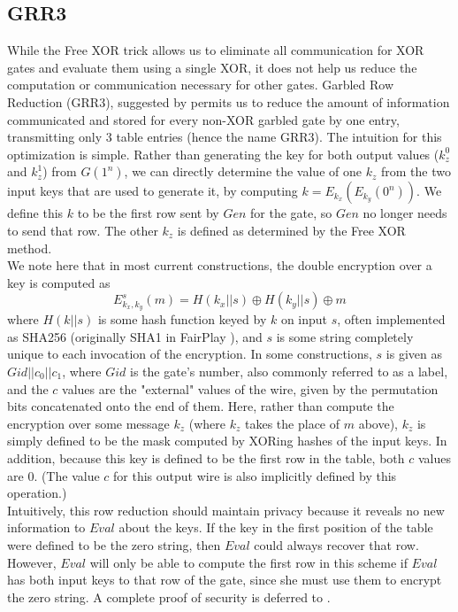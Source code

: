 \documentclass{article}
\begin{document}
\subsection{GRR3}
While the Free XOR trick allows us to eliminate all communication for XOR gates and evaluate them using a single XOR, it does not help us reduce the computation or communication necessary for other gates. Garbled Row Reduction (GRR3), suggested by \cite{GRR} permits us to reduce the amount of information communicated and stored for every non-XOR garbled gate by one entry, transmitting only 3 table entries (hence the name GRR3). The intuition for this optimization is simple. Rather than generating the key for both output values ($k_z^0$ and $k_z^1$) from $G(1^n)$, we can directly determine the value of one $k_z$ from the two input keys that are used to generate it, by computing $k = E_{k_x}(E_{k_y}(0^n))$. We define this $k$ to be the first row sent by $Gen$ for the gate, so $Gen$ no longer needs to send that row. The other $k_z$ is defined as determined by the Free XOR method. \\

We note here that in most current constructions, the double encryption over a key is computed as
$$E_{k_x,k_y}^s(m) = H(k_x || s) \oplus H(k_y || s) \oplus m$$
where $H(k||s)$ is some hash function keyed by $k$ on input $s$, often implemented as SHA256 (originally SHA1 in FairPlay \cite{FairPlay}), and $s$ is some string completely unique to each invocation of the encryption. In some constructions, $s$ is given as $Gid || c_0 || c_1$, where $Gid$ is the gate's number, also commonly referred to as a label, and the $c$ values are the "external" values of the wire, given by the permutation bits concatenated onto the end of them.  Here, rather than compute the encryption over some message $k_z$ (where $k_z$ takes the place of $m$ above), $k_z$ is simply defined to be the mask computed by XORing hashes of the input keys. In addition, because this key is defined to be the first row in the table, both $c$ values are $0$. (The value $c$ for this output wire is also implicitly defined by this operation.) \\

Intuitively, this row reduction should maintain privacy because it reveals no new information to $Eval$ about the keys. If the key in the first position of the table were defined to be the zero string, then $Eval$ could always recover that row. However, $Eval$ will only be able to compute the first row in this scheme if $Eval$ has both input keys to that row of the gate, since she must use them to encrypt the zero string. A complete proof of security is deferred to \cite{GRR}.
\end{document}
